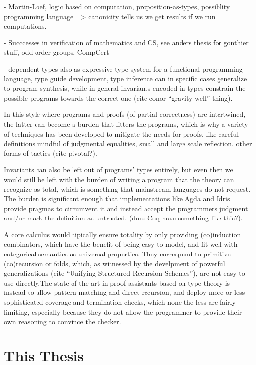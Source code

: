 \documentclass{article}
\begin{document}
- Martin-Loef, logic based on computation, proposition-as-types,
possiblity programming language => canonicity tells us we get results
if we run computations.

  - Succcesses in verification of mathematics and CS, see anders thesis for gonthier stuff, odd-order groups, CompCert.

  - dependent types also as expressive type system for a functional
  programming language, type guide development, type inference can in
  specific cases generalize to program synthesis, while in general
  invariants encoded in types constrain the possible programs towards
  the correct one (cite conor ``gravity well'' thing).
  
  In this style where programs and proofs (of partial correctness) are
  intertwined, the latter can become a burden that litters the
  programs, which is why a variety of techniques has been developed to
  mitigate the needs for proofs, like careful definitions mindful of judgmental equalities, small and
  large scale reflection, other forms of tactics (cite pivotal?).
    
  Invariants can also be left out of programs' types entirely, but
  even then we would still be left with the burden of writing a
  program that the theory can recognize as total, which is something
  that mainstream languages do not request. The burden is significant
  enough that implementations like Agda and Idris provide pragmas to
  circumvent it and instead accept the programmers judgment and/or
  mark the definition as untrusted. (does Coq have something like this?).

  A core calculus would tipically ensure totality by only providing
  (co)induction combinators, which have the benefit of being easy to
  model, and fit well with categorical semantics as universal
  properties.  They correspond to primitive (co)recursion or folds,
  which, as witnessed by the develpment of powerful generalizations
  (cite ``Unifying Structured Recursion Schemes''), are not easy to
  use directly.The state of the art in proof assistants based on type
  theory is instead to allow pattern matching and direct recursion,
  and deploy more or less sophisticated coverage and termination
  checks, which none the less are fairly limiting, especially because
  they do not allow the programmer to provide their own reasoning to
  convince the checker.
  

\section{This Thesis}
  
\end{document}
